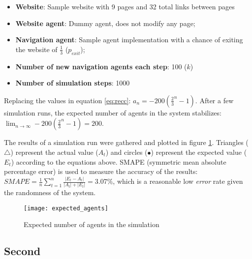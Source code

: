 \begin{itemize}
    \item \textbf{Website}: Sample website with 9 pages and 32 total links 
    between pages
    \item \textbf{Website agent}: Dummy agent, does not modify any page;
    \item \textbf{Navigation agent}: Sample agent implementation with a chance 
    of exiting the website of $\frac{1}{3}$ ($p_{exit}$);
    \item \textbf{Number of new navigation agents each step}: 100 ($k$)
    \item \textbf{Number of simulation steps}: 1000
\end{itemize}

Replacing the values in equation \ref{eq:recc}: $a_{n} = -200 \left ( 
\frac{2}{3}^{n} - 1 \right )$. After a few simulation runs, the expected number 
of agents in the system stabilizes: $\lim_{n\to \infty} -200 \left ( 
\frac{2}{3}^{n} - 1 \right ) = 200$.

The results of a simulation run were gathered and plotted in figure 
\ref{fig:expagents}. Triangles ($\triangle$) represent the actual value 
($A_{t}$) and circles ($\bullet$) represent the expected value ($E_{t}$) 
according to the equations above. SMAPE (symmetric mean absolute percentage 
error)\cite{makridakis1993accuracy} is used to measure the accuracy of the 
results: $ SMAPE = {\frac {1}{n}}\sum _{t=1}^{n}{\frac 
{\left|E_{t}-A_{t}\right|}{|A_{t}|+|E_{t}|}} = 3.07\% $, which is a reasonable 
low \textit{error} rate given the randomness of the system.

\begin{figure}[h]
    \begin{center}
        \leavevmode
        \texttt{[image: expected\_agents]}
        \caption{Expected number of agents in the simulation}
        \label{fig:expagents}
    \end{center}
\end{figure}

\subsection{Second}


